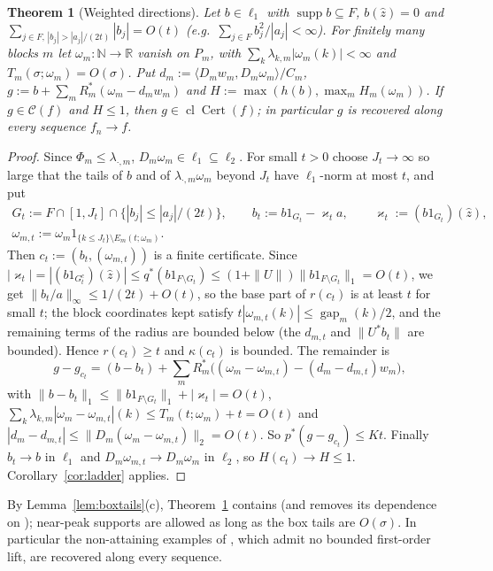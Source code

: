 \documentclass[10pt]{amsart}
\newtheorem{theorem}{Theorem}[section]
\theoremstyle{definition}
\theoremstyle{remark}
\newcommand{\supp}{\operatorname{supp}}
\newcommand{\R}{\mathbb R}
\newcommand{\N}{\mathbb N}
\newcommand{\Cset}{\mathcal C}
\newcommand{\Cert}{\operatorname{Cert}}
\newcommand{\cl}{\operatorname{cl}}
\newcommand{\gap}{\operatorname{gap}}
\newcommand{\zh}{\hat z}
\newcommand{\ip}[2]{\langle #1,#2\rangle}
\begin{document}
\begin{theorem}[Weighted directions]\label{thm:weighted}
Let $b\in\ell_1$ with $\supp b\subseteq F$, $b(\zh)=0$ and
$\sum_{j\in F,\,|b_j|>|a_j|/(2t)}|b_j|=O(t)$ \textup{(}e.g.\
$\sum_{j\in F}b_j^2/|a_j|<\infty$\textup{)}.  For finitely many blocks $m$
let $\omega_m:\N\to\R$ vanish on $P_m$, with
$\sum_k\lambda_{k,m}|\omega_m(k)|<\infty$ and $T_m(\sigma;\omega_m)=O(\sigma)$.
Put $d_m:=\ip{D_mw_m}{D_m\omega_m}/C_m$,
$g:=b+\sum_mR_m^*(\omega_m-d_mw_m)$ and $H:=\max(h(b),\max_mH_m(\omega_m))$.
If $g\in\Cset(f)$ and $H\le1$, then $g\in\cl\Cert(f)$; in particular $g$
is recovered along every sequence $f_n\to f$.
\end{theorem}

\begin{proof}
Since $\Phi_m\le\lambda_{\cdot,m}$, $D_m\omega_m\in\ell_1\subseteq\ell_2$.
For small $t>0$ choose $J_t\to\infty$ so large that the tails of $b$ and of
$\lambda_{\cdot,m}\omega_m$ beyond $J_t$ have $\ell_1$-norm at most $t$, and
put
\begin{gather*}
 G_t:=F\cap[1,J_t]\cap\{|b_j|\le|a_j|/(2t)\},\qquad
 b_t:=b1_{G_t}-\varkappa_ta,\qquad \varkappa_t:=(b1_{G_t})(\zh),\\
 \omega_{m,t}:=\omega_m1_{\{k\le J_t\}\setminus E_m(t;\omega_m)}.
\end{gather*}
Then $c_t:=(b_t,(\omega_{m,t}))$ is a finite certificate.  Since
$|\varkappa_t|=|(b1_{G_t^c})(\zh)|\le q^*(b1_{F\setminus
G_t})\le(1+\|U\|)\|b1_{F\setminus G_t}\|_1=O(t)$, we get
$\|b_t/a\|_\infty\le1/(2t)+O(t)$, so the base part of $r(c_t)$ is at least
$t$ for small $t$; the block coordinates kept satisfy
$t|\omega_{m,t}(k)|\le\gap_m(k)/2$, and the remaining terms of the radius
are bounded below (the $d_{m,t}$ and $\|U^*b_t\|$ are bounded).  Hence
$r(c_t)\ge t$ and $\kappa(c_t)$ is bounded.  The remainder is
\[
 g-g_{c_t}=(b-b_t)+\sum_mR_m^*\big((\omega_m-\omega_{m,t})-(d_m-d_{m,t})w_m
 \big),
\]
with $\|b-b_t\|_1\le\|b1_{F\setminus G_t}\|_1+|\varkappa_t|=O(t)$,
$\sum_k\lambda_{k,m}|\omega_m-\omega_{m,t}|(k)\le T_m(t;\omega_m)+t=O(t)$ and
$|d_m-d_{m,t}|\le\|D_m(\omega_m-\omega_{m,t})\|_2=O(t)$.  So
$p^*(g-g_{c_t})\le Kt$.  Finally $b_t\to b$ in $\ell_1$ and
$D_m\omega_{m,t}\to D_m\omega_m$ in $\ell_2$, so $H(c_t)\to H\le1$.
Corollary~\ref{cor:ladder} applies.
\end{proof}

By Lemma~\ref{lem:boxtails}(c), Theorem~\ref{thm:weighted} contains
\cite[Theorem~3.1]{PrA} (and removes its dependence on \cite{Check});
near-peak supports are allowed as long as the box tails are $O(\sigma)$.
In particular the non-attaining examples of \cite[Section~3]{PrA}, which
admit no bounded first-order lift, are recovered along every sequence.
\end{document}
